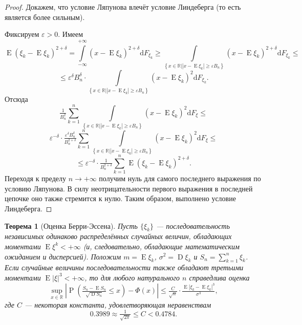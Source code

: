 \documentclass[12pt]{article}
\newtheorem{theorem}{Теорема}
\numberwithin{theorem}{section}
\theoremstyle{definition}
\newcommand{\RR}{\mathbb{R}}
\newcommand{\prob}{\operatorname{P}}
\newcommand{\expect}{\operatorname{E}}
\newcommand{\disp}{\operatorname{D}}
\newcommand{\diff}{\mathrm{d}}
\newcommand{\defineset}[2]{\left\{
	\left.
	#1
	\right\vert
	#2
	\right\}}
\begin{document}
	\begin{proof}
		Докажем, что условие Ляпунова влечёт условие Линдеберга (то есть является более сильным).
		
		Фиксируем $ \varepsilon > 0 $. Имеем
		$$ \expect(\xi_k - \expect\xi_k)^{2 + \delta}
		= \int\limits_{-\infty}^{+\infty} (x - \expect\xi_k)^{2 + \delta}\diff F_{\xi_k}
		\geqslant \int\limits_{\defineset{x \in \RR}{|x - \expect\xi_k| \geqslant \varepsilon B_n}}
		(x - \expect\xi_k)^{2 + \delta}\diff F_{\xi_k} \leqslant $$
		$$ \leqslant \varepsilon^{\delta}B_{n}^{\delta} \cdot
		\int\limits_{\defineset{x \in \RR}{|x - \expect\xi_k| \geqslant \varepsilon B_n}}
		(x - \expect\xi_k)^{2}\diff F_{\xi_k}. $$
		Отсюда
		$$ \tfrac{1}{B_n^2} \sum\limits_{k = 1}^{n}
		\int\limits_{\defineset{x \in \RR}{|x - \expect\xi_k| \geqslant \varepsilon B_n}}
		(x - \expect\xi_k)^2\diff F_\xi \leqslant $$
		$$ \varepsilon^{-\delta} \cdot \tfrac{\varepsilon^{\delta} B_n^{\delta}}{B_n^{2 +\delta}} \sum\limits_{k = 1}^{n}
		\int\limits_{\defineset{x \in \RR}{|x - \expect\xi_k| \geqslant \varepsilon B_n}}
		(x - \expect\xi_k)^2\diff F_\xi \leqslant $$
		$$ \leqslant \varepsilon^{-\delta} \cdot \tfrac{1}{B_n^{2 +\delta}} \sum\limits_{k = 1}^{n}
		\expect(\xi_k - \expect\xi_k)^{2 + \delta}. $$
		Переходя к пределу $ n \to +\infty $ получим нуль для самого последнего выражения 
		по условию Ляпунова. В силу неотрицательности первого выражения в последней цепочке
		оно также стремится к нулю. Таким образом, выполнено условие Линдеберга.
	\end{proof}
	
	\begin{theorem}[Оценка Берри-Эссена] \label{Berri Essen approx}
		Пусть $ \{\xi_k\} $ --- последовательность независимых одинаково распределённых случайных величин,
		обладающих моментами $ \expect\xi^k < + \infty $ 
		(и, следовательно, обладающие математическим ожиданием
		и дисперсией).
		Положим $ m = \expect\xi_k $, $ \sigma^2 = \disp\xi_k $
		и $ S_n = \sum\limits_{k = 1}^{n} \xi_k $.
		Если случайные величины последовательности также обладают третьими моментами $ \expect|\xi|^3 < +\infty $,
		то для любого натурального $ n $ справедлива оценка
		$$ \sup\limits_{x \in \RR} \left|\prob\left(\tfrac{S_n - \expect S_n}{\sqrt{\disp S_n}} \leqslant x \right) - \Phi(x)\right|
		\leqslant \tfrac{C}{\sqrt{n}} \cdot \tfrac{\expect|\xi_k - \expect\xi_k|^3}{\sigma^3}, $$
		где $ C $ --- некоторая константа, удовлетворяющая неравенствам
		$$ 0.3989 \approx \tfrac{1}{\sqrt{2\pi}} \leqslant C < 0.4784. $$
	\end{theorem}
	
\end{document}

